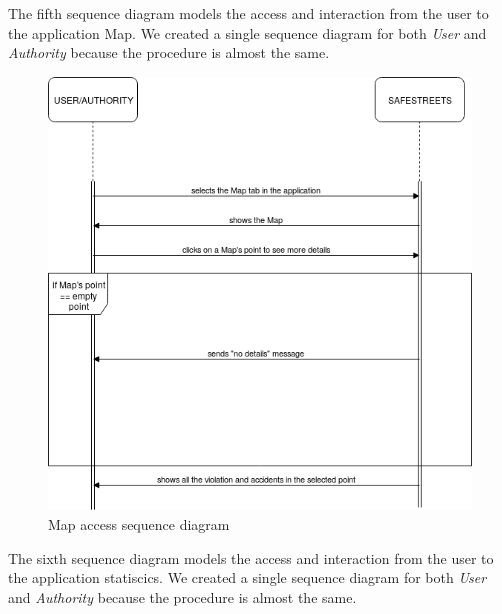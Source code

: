 \documentclass {article}
\begin{document}
		The fifth sequence diagram models the access and interaction from the user to the application Map. We created a single sequence diagram for both {\it User} and {\it Authority} because the procedure is almost the same.
		\begin{figure}[H]
			\centering
			\includegraphics[scale=0.55]{Images/Diagrams/57SeqDiagram.png}
			\caption{Map access sequence diagram}
		\end{figure}
		The sixth sequence diagram models the access and interaction from the user to the application statiscics. We created a single sequence diagram for both {\it User} and {\it Authority} because the procedure is almost the same.
\end{document}
